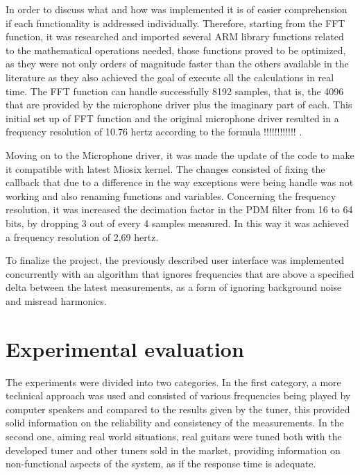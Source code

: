 In order to discuss what and how was implemented it is of easier comprehension if each functionality is addressed individually. Therefore, starting from the FFT function, it was researched and imported several ARM library functions related to the mathematical operations needed, those functions proved to be optimized, as they were not only orders of magnitude faster than the others available in the literature as they also achieved the goal of execute all the calculations in real time. The FFT function can handle successfully 8192 samples, that is, the 4096 that are provided by the microphone driver plus the imaginary part of each. This initial set up of FFT function and the original microphone driver resulted in a frequency resolution of 10.76 hertz according to the formula !!!!!!!!!!!! .

Moving on to the Microphone driver, it was made the update of the code to make it compatible with latest Miosix kernel. The changes consisted of fixing the callback that due to a difference in the way exceptions were being handle was not working and also renaming functions and variables. Concerning the frequency resolution, it was increased the decimation factor in the PDM filter from 16 to 64 bits, by dropping 3 out of every 4 samples measured. In this way it was achieved a frequency resolution of 2,69 hertz. 

To finalize the project, the previously described user interface was implemented concurrently with an algorithm that ignores frequencies that are above a specified delta between the latest measurements, as a form of ignoring background noise and misread harmonics.


\section{Experimental evaluation}
The experiments were divided into two categories. In the first category, a more technical approach was used and consisted of various frequencies being played by computer speakers and compared to the results given by the tuner, this provided solid information on the reliability and consistency of the measurements. In the second one, aiming real world situations, real guitars were tuned both with the developed tuner and other tuners sold in the market, providing information on non-functional aspects of the system, as if the response time is adequate. 
